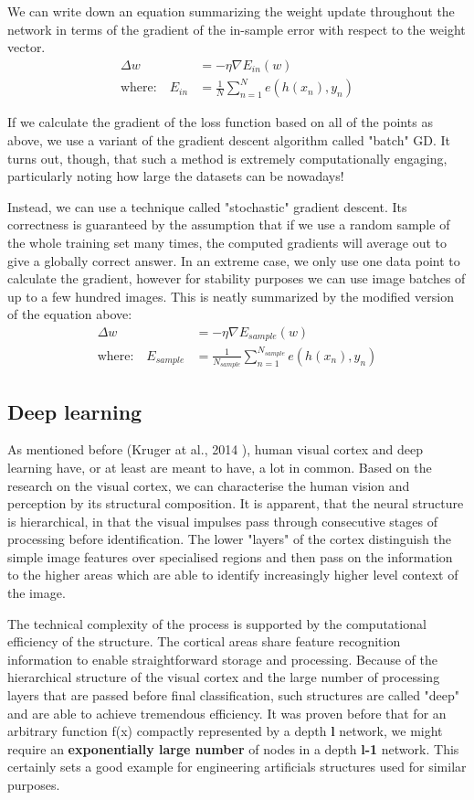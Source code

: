 \documentclass[a4paper, 12pt]{article}
\numberwithin{equation}{section}
\begin{document}
	We can write down an equation summarizing the weight update throughout the network in terms of the gradient of the in-sample error with respect to the weight vector.
	\begin{align}
	\Delta w &= - \eta \nabla E_{in}(w) \\
	\textrm{where:} \quad E_{in} &= \frac{1}{N} \sum_{n = 1}^{N} e(h(x_n), y_n)
	\end{align}
	
	If we calculate the gradient of the loss function based on all of the points as above, we use a variant of the gradient descent algorithm called "batch" GD. It turns out, though, that such a method is extremely computationally engaging, particularly noting how large the datasets can be nowadays!
	
	Instead, we can use a technique called "stochastic" gradient descent. Its correctness is guaranteed by the assumption that if we use a random sample of the whole training set many times, the computed gradients will average out to give a globally correct answer. In an extreme case, we only use one data point to calculate the gradient, however for stability purposes we can use image batches of up to a few hundred images. This is neatly summarized by the modified version of the equation above:
	\begin{align}
	\Delta w &= - \eta \nabla E_{sample}(w) \\
	\textrm{where:} \quad E_{sample} &= \frac{1}{N_{sample}} \sum_{n = 1}^{N_{sample}} e(h(x_n), y_n)
	\end{align}
	
	\subsection{Deep learning}
	
	As mentioned before (Kruger at al., 2014 \cite{kruger2013deep}), human visual cortex and deep learning have, or at least are meant to have, a lot in common. Based on the research on the visual cortex, we can characterise the human vision and perception by its structural composition. It is apparent, that the neural structure is hierarchical, in that the visual impulses pass through consecutive stages of processing before identification. The lower "layers" of the cortex distinguish the simple image features over specialised regions and then pass on the information to the higher areas which are able to identify increasingly higher level context of the image.
	
	The technical complexity of the process is supported by the computational efficiency of the structure. The cortical areas share feature recognition information to enable straightforward storage and processing. Because of the hierarchical structure of the visual cortex and the large number of processing layers that are passed before final classification, such structures are called "deep" and are able to achieve tremendous efficiency. It was proven before that for an arbitrary function f(x) compactly represented by a depth \textbf{l} network, we might require an \textbf{exponentially large number} of nodes in a depth \textbf{l-1} network. This certainly sets a good example for engineering artificials structures used for similar purposes.
	
\end{document}

